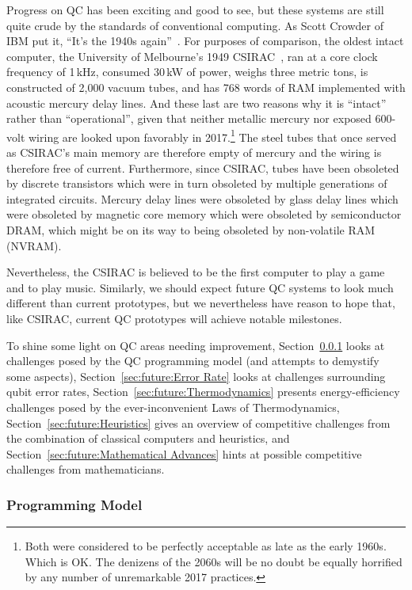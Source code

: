 Progress on QC has been exciting and good to see, but these systems are
still quite crude by the standards of conventional computing.
As Scott Crowder of IBM put it,
``It's the 1940s again''~\cite{BradJones2017IBM-QC-Crowder}.
For purposes of comparison, the oldest intact computer, the
University of Melbourne's 1949
CSIRAC~\cite{CSIRACMuseumVictoria,CSIRACUniversityMelbourne},
ran at a core clock frequency of 1\,kHz, consumed 30\,kW of power,
weighs three metric tons,
is constructed of 2,000 vacuum tubes, and has 768 words of RAM
implemented with acoustic mercury delay lines.
And these last are two reasons why it is ``intact'' rather than
``operational'', given that
neither metallic mercury nor exposed 600-volt wiring are
looked upon favorably in 2017.\footnote{
	Both were considered to be perfectly acceptable as late as the
	early 1960s.
	Which is OK.
	The denizens of the 2060s will be no doubt be equally horrified
	by any number of unremarkable 2017 practices.}
The steel tubes that once served as CSIRAC's main memory are therefore
empty of mercury and the wiring is therefore free of current.
Furthermore, since CSIRAC, tubes have been obsoleted by discrete
transistors which were in turn obsoleted by multiple generations of
integrated circuits.
Mercury delay lines were obsoleted by glass delay lines which were
obsoleted by magnetic core memory which were obsoleted by
semiconductor DRAM, which might be on its way to being obsoleted
by non-volatile RAM (NVRAM).

Nevertheless, the CSIRAC is believed to be the first computer to
play a game and to play music.
Similarly, we should expect future QC systems to look much different
than current prototypes, but we nevertheless have reason to hope that,
like CSIRAC, current QC prototypes will achieve notable milestones.

To shine some light on QC areas needing improvement,
Section~\ref{sec:future:Programming Model} looks at challenges posed by the QC
programming model (and attempts to demystify some aspects),
Section~\ref{sec:future:Error Rate} looks at challenges surrounding qubit
error rates,
Section~\ref{sec:future:Thermodynamics} presents energy-efficiency challenges
posed by the ever-inconvenient Laws of Thermodynamics,
Section~\ref{sec:future:Heuristics} gives an overview of competitive
challenges from the combination of classical computers and heuristics,
and
Section~\ref{sec:future:Mathematical Advances} hints at possible competitive
challenges from mathematicians.

\subsubsection{Programming Model}
\label{sec:future:Programming Model}


